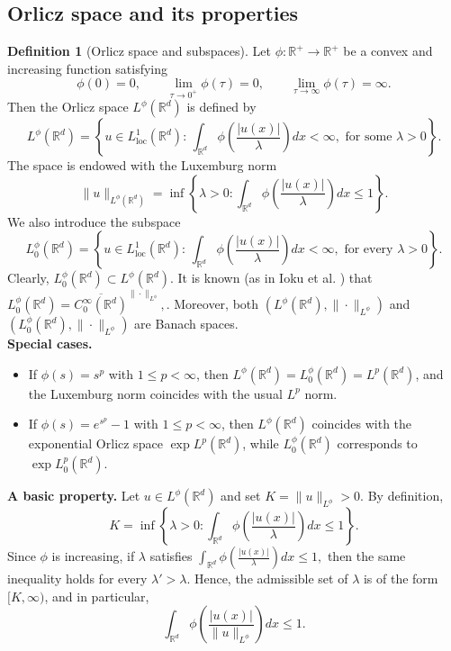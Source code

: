 \documentclass[a4paper,11pt]{amsart}
\numberwithin{equation}{section}
\theoremstyle{plain}
\theoremstyle{definition}
\newtheorem{definition}[theorem]{Definition}
\begin{document}
\subsection{Orlicz space and its properties}
\begin{definition}[Orlicz space and subspaces]
Let $\phi:\mathbb{R}^+ \to \mathbb{R}^+$ be a convex and increasing function satisfying
\[
\phi(0)=0, 
\qquad 
\lim_{\tau\to0^+}\phi(\tau)=0, 
\qquad 
\lim_{\tau\to\infty}\phi(\tau)=\infty.
\]
Then the Orlicz space $L^\phi(\mathbb{R}^d)$ is defined by
\[
L^\phi(\mathbb{R}^d)
=
\left\{
u\in L^1_{\mathrm{loc}}(\mathbb{R}^d)
:\,
\int_{\mathbb{R}^d}
\phi\!\left(\frac{|u(x)|}{\lambda}\right)dx
<\infty,
\text{ for some } \lambda>0
\right\}.
\]
The space is endowed with the Luxemburg norm
\[
\|u\|_{L^\phi(\mathbb{R}^d)}
=
\inf\left\{
\lambda>0:
\int_{\mathbb{R}^d}
\phi\!\left(\frac{|u(x)|}{\lambda}\right)dx
\le 1
\right\}.
\]
We also introduce the subspace
\[
L^\phi_0(\mathbb{R}^d)
=
\left\{
u\in L^1_{\mathrm{loc}}(\mathbb{R}^d)
:\,
\int_{\mathbb{R}^d}
\phi\!\left(\frac{|u(x)|}{\lambda}\right)dx
<\infty,
\text{ for every } \lambda>0
\right\}.
\]
Clearly, $L^\phi_0(\mathbb{R}^d) \subset L^\phi(\mathbb{R}^d)$.
It is known (as in Ioku et al. \cite{Ioku}) that
$
L^\phi_0(\mathbb{R}^d)
=
\overline{C_0^\infty(\mathbb{R}^d)}^{\|\cdot\|_{L^\phi}},
$. Moreover, both 
$(L^\phi(\mathbb{R}^d),\|\cdot\|_{L^\phi})$ 
and 
$(L^\phi_0(\mathbb{R}^d),\|\cdot\|_{L^\phi})$ 
are Banach spaces.\\
\textbf{Special cases.}
\begin{itemize}
\item If $\phi(s)=s^p$ with $1\le p<\infty$, then 
$L^\phi(\mathbb{R}^d)=L^\phi_0(\mathbb{R}^d)=L^p(\mathbb{R}^d)$, 
and the Luxemburg norm coincides with the usual $L^p$ norm.
\item If $\phi(s)=e^{s^p}-1$ with $1\le p<\infty$, then 
$L^\phi(\mathbb{R}^d)$ coincides with the exponential Orlicz space 
$\exp L^p(\mathbb{R}^d)$, while 
$L^\phi_0(\mathbb{R}^d)$ corresponds to 
$\exp L^p_0(\mathbb{R}^d)$.
\end{itemize}
\noindent
\textbf{A basic property.}
Let $u\in L^\phi(\mathbb{R}^d)$ and set
$
K= \|u\|_{L^\phi} > 0.
$
By definition,
\[
K
=
\inf\left\{
\lambda>0:
\int_{\mathbb{R}^d}
\phi\!\left(\frac{|u(x)|}{\lambda}\right)dx
\le 1
\right\}.
\]
Since $\phi$ is increasing, if $\lambda$ satisfies
$
\displaystyle \int_{\mathbb{R}^d}
\phi\left(\frac{|u(x)|}{\lambda}\right)dx
\le 1,
$
then the same inequality holds for every $\lambda'>\lambda$.
Hence, the admissible set of $\lambda$ is of the form $[K,\infty)$, and in particular,
$$
\int_{\mathbb{R}^d}
\phi\!\left(
\frac{|u(x)|}{\|u\|_{L^\phi}}
\right)dx
\le 1.
$$
\end{definition}
\end{document}
